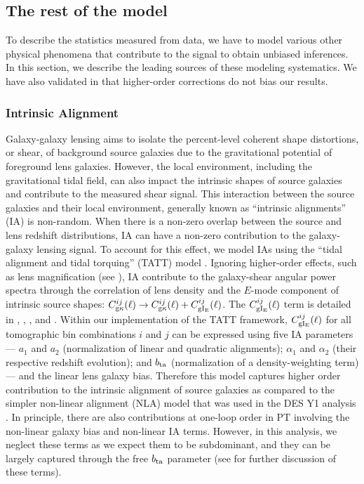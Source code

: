 \documentclass[aps, prd,twocolumn,superscriptaddress,nofootinbib,preprintnumbers]{revtex4-1}
\newcommand{\IR}[1]{{\color{red}[\textbf{Note for IR}: #1]}}
\begin{document}
\subsection{The rest of the model}
\label{sec:model_rest}

To describe the statistics measured from data, we have to model various other physical phenomena that contribute to the signal to obtain unbiased inferences. In this section, we describe the leading sources of these modeling systematics. We have also validated in \cite{y3-generalmethods} that higher-order corrections do not bias our results. 

\subsubsection{Intrinsic Alignment} 
Galaxy-galaxy lensing aims to isolate the percent-level coherent shape distortions, or shear, of background source galaxies due to the gravitational potential of foreground lens galaxies. However, the local environment, including the gravitational tidal field, can also impact the intrinsic shapes of source galaxies and contribute to the measured shear signal. This interaction between the source galaxies and their local environment, generally known as ``intrinsic alignments'' (IA) is non-random. When there is a non-zero overlap between the source and lens redshift distributions, IA can have a non-zero contribution to the galaxy-galaxy lensing signal. To account for this effect, we model IAs using the ``tidal alignment and tidal torquing'' (TATT) model \citep{Blazek_2019}. Ignoring higher-order effects, such as lens magnification (see \citep{y3-gglensing,y3-2x2ptmagnification}), IA contribute to the galaxy-shear angular power spectra through the correlation of lens density and the $E$-mode component of intrinsic source shapes: $C^{ij}_{\rm g\kappa}(\ell) \to C^{ij}_{\rm g\kappa}(\ell) + C^{ij}_{\rm gI_{\rm E}}(\ell)$. The $C^{ij}_{\rm gI_{\rm E}}(\ell)$ term is detailed in \citet*{y3-generalmethods}, \citet*{y3-cosmicshear2}, \citet*{y3-gglensing}, and \citet{Blazek_2019}. Within our implementation of the TATT framework, $C^{ij}_{\rm gI_{\rm E}}(\ell)$ for all tomographic bin combinations $i$ and $j$ can be expressed using five IA parameters --- $a_1$ and $a_2$ (normalization of linear and quadratic alignments); $\alpha_1$ and $\alpha_2$ (their respective redshift evolution); and $b_{\rm ta}$ (normalization of a density-weighting term) --- and the linear lens galaxy bias. Therefore this model captures higher order contribution to the intrinsic alignment of source galaxies as compared to the simpler non-linear alignment (NLA) model that was used in the DES Y1 analysis \citep{Krause2017,Abbott_2018}. In principle, there are also contributions at one-loop order in PT involving the non-linear galaxy bias and non-linear IA terms. However, in this analysis, we neglect these terms as we expect them to be subdominant, and they can be largely captured through the free $b_{\rm ta}$ parameter (see \citep{Blazek_2015} for further discussion of these terms). 
\end{document}
